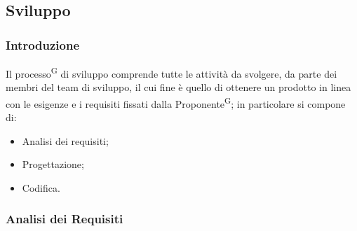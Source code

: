 \documentclass[8pt]{article}
\newcommand{\glossterm}[1]{#1\textsuperscript{G}} %
\begin{document}
\subsection{Sviluppo}

\subsubsection{Introduzione} 
Il \glossterm{processo} di sviluppo comprende tutte le attività da svolgere, da parte dei membri del team di sviluppo, il cui fine è quello di ottenere un prodotto in linea con le esigenze e i requisiti fissati dalla \glossterm{Proponente}; in particolare si compone di:
\begin{itemize}
    \item Analisi dei requisiti;
    \item Progettazione;
    \item Codifica.
\end{itemize} 
\subsubsection{Analisi dei Requisiti} \label{sec:analisi-rischi}
\end{document}
